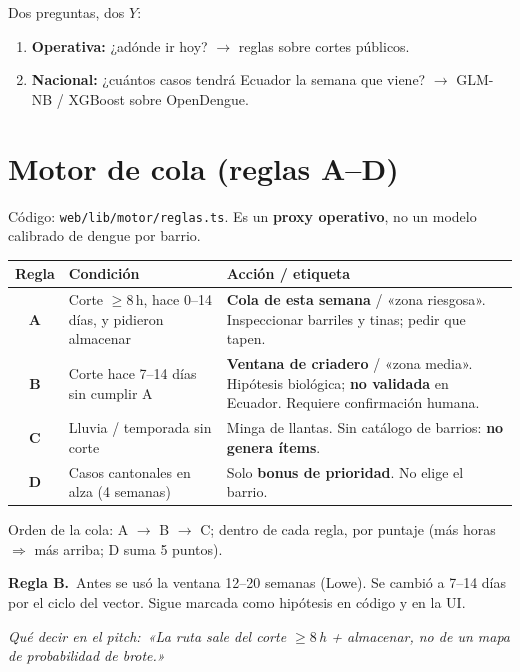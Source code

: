 \documentclass[11pt,a4paper]{article}
\newcommand{\nota}[2]{%
  \par\vspace{4pt}\noindent
  \colorbox{panelvs}{\parbox{\dimexpr\linewidth-2\fboxsep}{%
  \textbf{\color{azulvs}#1.}\ #2}}\par\vspace{4pt}}
\newcommand{\pitch}[1]{%
  \par\vspace{2pt}\noindent
  \textit{\textcolor{azulvs}{Qué decir en el pitch:}\ #1}\par\vspace{4pt}}
\begin{document}
Dos preguntas, dos $Y$:

\begin{enumerate}[leftmargin=1.4em]
  \item \textbf{Operativa:} ¿adónde ir hoy? $\rightarrow$ reglas sobre
        cortes públicos.
  \item \textbf{Nacional:} ¿cuántos casos tendrá Ecuador la semana que
        viene? $\rightarrow$ GLM-NB / XGBoost sobre OpenDengue.
\end{enumerate}

\section{Motor de cola (reglas A--D)}

Código: \texttt{web/lib/motor/reglas.ts}. Es un \textbf{proxy operativo},
no un modelo calibrado de dengue por barrio.

\begin{longtable}{@{}cp{3.2cm}Y@{}}
\toprule
\textbf{Regla} & \textbf{Condición} & \textbf{Acción / etiqueta}\\
\midrule
\endhead
\textbf{A} & Corte $\geq 8$\,h, hace 0--14 días, y pidieron almacenar &
\textbf{Cola de esta semana} / «zona riesgosa». Inspeccionar barriles y
tinas; pedir que tapen.\\
\textbf{B} & Corte hace 7--14 días sin cumplir A &
\textbf{Ventana de criadero} / «zona media». Hipótesis biológica;
\textbf{no validada} en Ecuador. Requiere confirmación humana.\\
\textbf{C} & Lluvia / temporada sin corte & Minga de llantas. Sin
catálogo de barrios: \textbf{no genera ítems}.\\
\textbf{D} & Casos cantonales en alza (4 semanas) & Solo \textbf{bonus
de prioridad}. No elige el barrio.\\
\bottomrule
\end{longtable}

Orden de la cola: A $\rightarrow$ B $\rightarrow$ C; dentro de cada
regla, por puntaje (más horas $\Rightarrow$ más arriba; D suma 5 puntos).

\nota{Regla B}{Antes se usó la ventana 12--20 semanas (Lowe). Se cambió
a 7--14 días por el ciclo del vector. Sigue marcada como hipótesis en
código y en la UI.}

\pitch{«La ruta sale del corte $\geq 8$\,h + almacenar, no de un mapa
de probabilidad de brote.»}
\end{document}
